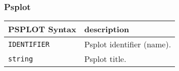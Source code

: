 \subsubsection{Psplot}
\label{sec:uipsplot}



\begin{tabularx}{\textwidth}{l|X}
PSPLOT Syntax     & description \\
\hline
\verb+IDENTIFIER+ & Psplot identifier (name). \\
\verb+string+     & Psplot title. \\
\end{tabularx}
